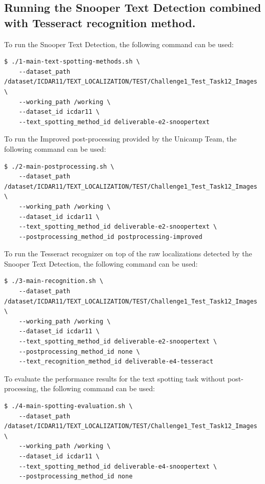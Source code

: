 \subsection{Running the Snooper Text Detection combined with Tesseract recognition method.}

To run the Snooper Text Detection, the following command can be used:
\begin{lstlisting}[style=fancyterminal]
 $ ./1-main-text-spotting-methods.sh \
    --dataset_path /dataset/ICDAR11/TEXT_LOCALIZATION/TEST/Challenge1_Test_Task12_Images \
    --working_path /working \
    --dataset_id icdar11 \
    --text_spotting_method_id deliverable-e2-snoopertext

\end{lstlisting}

To run the Improved post-processing provided by the Unicamp Team, the following command can be used:

\begin{lstlisting}[style=fancyterminal]
 $ ./2-main-postprocessing.sh \
    --dataset_path /dataset/ICDAR11/TEXT_LOCALIZATION/TEST/Challenge1_Test_Task12_Images \
    --working_path /working \
    --dataset_id icdar11 \
    --text_spotting_method_id deliverable-e2-snoopertext \
    --postprocessing_method_id postprocessing-improved
\end{lstlisting}

To run the Tesseract recognizer on top of the raw localizations detected by the Snooper Text Detection, the following command can be used:
\begin{lstlisting}[style=fancyterminal]
 $ ./3-main-recognition.sh \
    --dataset_path /dataset/ICDAR11/TEXT_LOCALIZATION/TEST/Challenge1_Test_Task12_Images \
    --working_path /working \
    --dataset_id icdar11 \
    --text_spotting_method_id deliverable-e2-snoopertext \
    --postprocessing_method_id none \
    --text_recognition_method_id deliverable-e4-tesseract
\end{lstlisting}

To evaluate the performance results for the text spotting task without post-processing, the following command can be used:
\begin{lstlisting}[style=fancyterminal]
 $ ./4-main-spotting-evaluation.sh \
    --dataset_path /dataset/ICDAR11/TEXT_LOCALIZATION/TEST/Challenge1_Test_Task12_Images \
    --working_path /working \
    --dataset_id icdar11 \
    --text_spotting_method_id deliverable-e4-snoopertext \
    --postprocessing_method_id none
\end{lstlisting}

